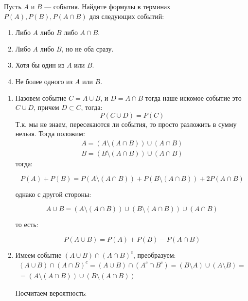 \documentclass[document]{subfiles}
\begin{document}
\begin{problem}
    Пусть $A$ и $B$ --- события. Найдите формулы в терминах $P(A), P(B), P(A \cap B)$ для следующих событий:
    \begin{enumerate}
        \item Либо $A$ либо $B$ либо $A \cap B$.
        \item Либо $A$ либо $B$, но не оба сразу.
        \item Хотя бы один из $A$ или $B$.
        \item Не более одного из $A$ или $B$.
    \end{enumerate}
\end{problem}
\begin{solution}
 
    \begin{enumerate}
        \item Назовем событие $C = A \cup B$, и $D = A \cap B$ тогда наше искомое событие это $C \cup D$, причем $D \subset C$, тогда:
            \[P(C \cup D) = P(C)\]
            Т.к. мы не знаем, пересекаются ли события, то просто разложить в сумму нельзя. Тогда положим:
            \begin{gather*}
                A = (A \setminus (A \cap B)) \cup (A \cap B) \\
                B = (B \setminus (A \cap B)) \cup (A \cap B)
            \end{gather*}
            тогда:

            \[P(A) + P(B) = P(A \setminus (A \cap B)) + P(B \setminus (A \cap B)) + 2 P(A \cap B)\]
            
            однако с другой стороны:

            \[A \cup B = (A \setminus (A \cap B)) \cup (B \setminus (A \cap B)) \cup (A \cap B)\]

            то есть:

            \[P(A \cup B) = P(A) + P(B) - P(A \cap B)\]
        
        \item Имеем событие $(A \cup B) \cap (A \cap B)^c$, преобразуем:
            \begin{gather*}
                 (A \cup B) \cap (A \cap B)^c = (A \cup B) \cap (A^c \cap B^c) = (B \setminus A) \cup (A \setminus B) = \\
                 = (A \setminus (A \cap B)) \cup (B \setminus (A \cap B)) 
            \end{gather*}

            Посчитаем вероятность:


\end{enumerate}
\end{solution}
\end{document}
